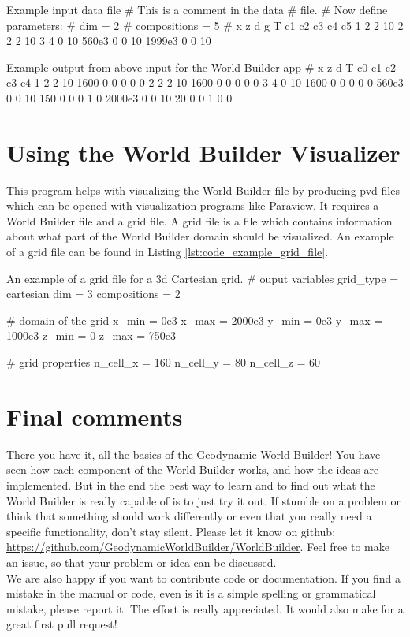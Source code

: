 \documentclass{book}
\newcommand{\GWB}{{Geodynamic World Builder}}
\newcommand{\WB}{{World Builder}}
\newcommand{\paraview}{{Paraview}}
\begin{document}
\begin{bashcode}[label={lst:code_example_app_input_data_file}]{Example input data file}
# This is a comment in the data
# file. 
# Now define parameters:
# dim = 2
# compositions = 5
# x      z d g  T c1 c2 c3 c4 c5
  1      2 2 10
  2      2 2 10
  3      4 0 10
  560e3  0 0 10
  1999e3 0 0 10
\end{bashcode}

\begin{bashcode}[label={lst:code_example_app_out}]{Example output from above input for the \WB{} app}
# x z d T c0 c1 c2 c3 c4 
1 2 2 10 1600 0 0 0 0 0 
2 2 2 10 1600 0 0 0 0 0 
3 4 0 10 1600 0 0 0 0 0 
560e3 0 0 10 150 0 0 0 1 0 
2000e3 0 0 10 20 0 0 1 0 0
\end{bashcode}

\section{Using the World Builder Visualizer}
\label{section:using_the_visualizer}
This program helps with visualizing the \WB{} file by producing pvd files which can be opened with visualization programs like \paraview{}. It requires a \WB{} file and a grid file. A grid file is a file which contains information about what part of the \WB{} domain should be visualized. An example of a grid file can be found in Listing \ref{lst:code_example_grid_file}.

\begin{bashcode}[label={lst:code_example_grid_file}]{An example of a grid file for a 3d Cartesian grid.}
# ouput variables
grid_type = cartesian
dim = 3
compositions = 2

# domain of the grid
x_min = 0e3
x_max = 2000e3
y_min = 0e3
y_max = 1000e3
z_min = 0 
z_max = 750e3

# grid properties
n_cell_x = 160
n_cell_y = 80
n_cell_z = 60
\end{bashcode}

\section{Final comments}
There you have it, all the basics of the \GWB{}! You have seen how each component of the \WB{} works, and how the ideas are implemented. But in the end the best way to learn and to find out what the \WB{} is really capable of is to just try it out. If stumble on a problem or think that something should work differently or even that you really need a specific functionality, don't stay silent. Please let it know on github: \url{https://github.com/GeodynamicWorldBuilder/WorldBuilder}. Feel free to make an issue, so that your problem or idea can be discussed. 
\\
We are also happy if you want to contribute code or documentation. If you find a mistake in the manual or code, even is it is a simple spelling or grammatical mistake, please report it. The effort is really appreciated. It would also make for a great first pull request!
\end{document}
